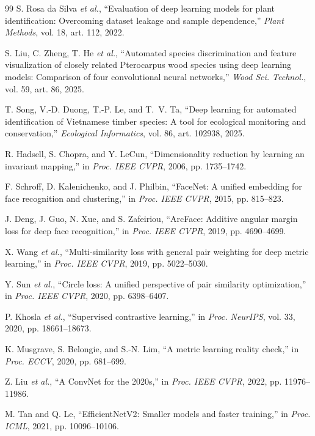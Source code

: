 \begin{thebibliography}{99}
S. Rosa da Silva \emph{et al.}, ``Evaluation of deep learning models for plant identification: Overcoming dataset leakage and sample dependence,'' \emph{Plant Methods}, vol. 18, art. 112, 2022.

S. Liu, C. Zheng, T. He \emph{et al.}, ``Automated species discrimination and feature visualization of closely related Pterocarpus wood species using deep learning models: Comparison of four convolutional neural networks,'' \emph{Wood Sci. Technol.}, vol. 59, art. 86, 2025.

T. Song, V.-D. Duong, T.-P. Le, and T.~V. Ta, ``Deep learning for automated identification of Vietnamese timber species: A tool for ecological monitoring and conservation,'' \emph{Ecological Informatics}, vol. 86, art. 102938, 2025.

R. Hadsell, S. Chopra, and Y. LeCun, ``Dimensionality reduction by learning an invariant mapping,'' in \emph{Proc. IEEE CVPR}, 2006, pp. 1735--1742.

F. Schroff, D. Kalenichenko, and J. Philbin, ``FaceNet: A unified embedding for face recognition and clustering,'' in \emph{Proc. IEEE CVPR}, 2015, pp. 815--823.

J. Deng, J. Guo, N. Xue, and S. Zafeiriou, ``ArcFace: Additive angular margin loss for deep face recognition,'' in \emph{Proc. IEEE CVPR}, 2019, pp. 4690--4699.

X. Wang \emph{et al.}, ``Multi-similarity loss with general pair weighting for deep metric learning,'' in \emph{Proc. IEEE CVPR}, 2019, pp. 5022--5030.

Y. Sun \emph{et al.}, ``Circle loss: A unified perspective of pair similarity optimization,'' in \emph{Proc. IEEE CVPR}, 2020, pp. 6398--6407.

P. Khosla \emph{et al.}, ``Supervised contrastive learning,'' in \emph{Proc. NeurIPS}, vol. 33, 2020, pp. 18661--18673.

K. Musgrave, S. Belongie, and S.-N. Lim, ``A metric learning reality check,'' in \emph{Proc. ECCV}, 2020, pp. 681--699.

Z. Liu \emph{et al.}, ``A ConvNet for the 2020s,'' in \emph{Proc. IEEE CVPR}, 2022, pp. 11976--11986.

M. Tan and Q. Le, ``EfficientNetV2: Smaller models and faster training,'' in \emph{Proc. ICML}, 2021, pp. 10096--10106.


\end{thebibliography}

